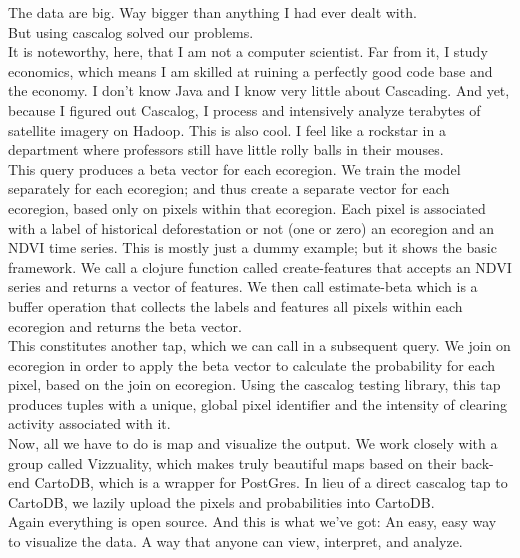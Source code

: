 \documentclass{article}
\begin{document}
The data are big.  Way bigger than anything I had ever dealt with.\\

But using cascalog solved our problems.\\

It is noteworthy, here, that I am not a computer scientist.  Far from
it, I study economics, which means I am skilled at ruining a perfectly
good code base and the economy.  I don't know Java and I know very
little about Cascading.  And yet, because I figured out Cascalog, I
process and intensively analyze terabytes of satellite imagery on
Hadoop.  This is also cool.  I feel like a rockstar in a department
where professors still have little rolly balls in their mouses.\\

This query produces a beta vector for each ecoregion.  We train the
model separately for each ecoregion; and thus create a separate vector
for each ecoregion, based only on pixels within that ecoregion.  Each
pixel is associated with a label of historical deforestation or not
(one or zero) an ecoregion and an NDVI time series.  This is mostly
just a dummy example; but it shows the basic framework.  We call a
clojure function called create-features that accepts an NDVI series
and returns a vector of features.  We then call estimate-beta which is
a buffer operation that collects the labels and features all pixels
within each ecoregion and returns the beta vector.\\

This constitutes another tap, which we can call in a subsequent query.
We join on ecoregion in order to apply the beta vector to calculate
the probability for each pixel, based on the join on ecoregion. Using
the cascalog testing library, this tap produces tuples with a unique,
global pixel identifier and the intensity of clearing activity
associated with it.\\

Now, all we have to do is map and visualize the output.  We work
closely with a group called Vizzuality, which makes truly beautiful
maps based on their back-end CartoDB, which is a wrapper for PostGres.
In lieu of a direct cascalog tap to CartoDB, we lazily upload the
pixels and probabilities into CartoDB.  \\

Again everything is open source.  And this is what we've got: An easy,
easy way to visualize the data.  A way that anyone can view,
interpret, and analyze.  \\
\end{document}
